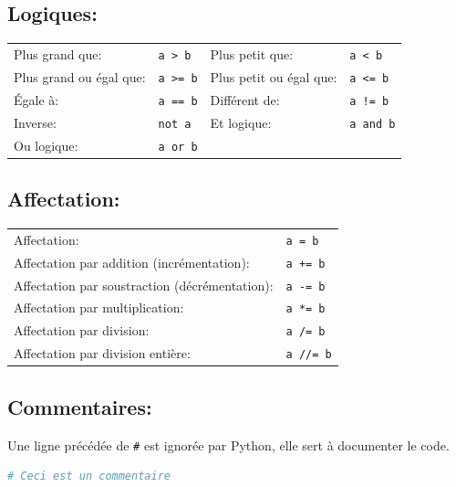 \documentclass[a4paper,12pt,twoside]{article}
\begin{document}
    \subsection*{Logiques:}
    \begin{tabular}{l l | l l}
        Plus grand que: & \texttt{a > b} &
        Plus petit que: & \texttt{a < b} \\
        Plus grand ou égal que: & \texttt{a >= b} &
        Plus petit ou égal que: & \texttt{a <= b} \\
        Égale à: & \texttt{a == b} &
        Différent de: & \texttt{a != b} \\
        Inverse: & \texttt{not a} &
        Et logique: & \texttt{a and b} \\
        Ou logique: & \texttt{a or b} &  \\
    \end{tabular}

    \subsection*{Affectation:}
    \begin{tabular}{l l}
        Affectation: & \texttt{a = b} \\
        Affectation par addition (incrémentation): & \texttt{a += b} \\
        Affectation par soustraction (décrémentation): & \texttt{a -= b} \\
        Affectation par multiplication: & \texttt{a *= b} \\
        Affectation par division: & \texttt{a /= b} \\
        Affectation par division entière: & \texttt{a //= b} \\
    \end{tabular}

    \subsection*{Commentaires:}
    Une ligne précédée de \texttt{\#} est ignorée par Python, elle sert à documenter le code.
    \begin{lstlisting}[language=Python]
    # Ceci est un commentaire
    \end{lstlisting}

\end{document}
